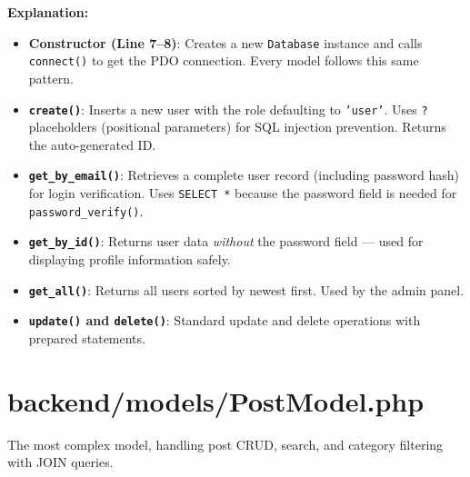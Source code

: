 \documentclass[12pt,a4paper]{report}
\begin{document}
\textbf{Explanation:}
\begin{itemize}
    \item \textbf{Constructor (Line 7--8)}: Creates a new \texttt{Database} instance and calls \texttt{connect()} to get the PDO connection. Every model follows this same pattern.
    \item \textbf{\texttt{create()}}: Inserts a new user with the role defaulting to \texttt{'user'}. Uses \texttt{?} placeholders (positional parameters) for SQL injection prevention. Returns the auto-generated ID.
    \item \textbf{\texttt{get\_by\_email()}}: Retrieves a complete user record (including password hash) for login verification. Uses \texttt{SELECT *} because the password field is needed for \texttt{password\_verify()}.
    \item \textbf{\texttt{get\_by\_id()}}: Returns user data \textit{without} the password field --- used for displaying profile information safely.
    \item \textbf{\texttt{get\_all()}}: Returns all users sorted by newest first. Used by the admin panel.
    \item \textbf{\texttt{update()} and \texttt{delete()}}: Standard update and delete operations with prepared statements.
\end{itemize}

\section{backend/models/PostModel.php}
The most complex model, handling post CRUD, search, and category filtering with JOIN queries.
\end{document}
